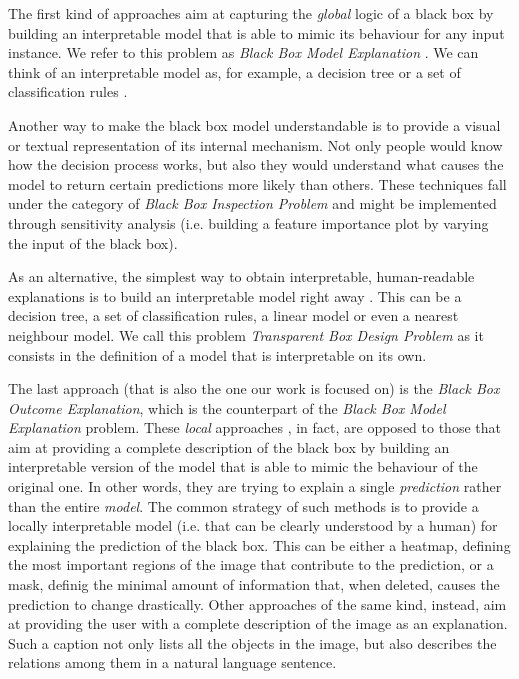 \documentclass[12pt, twoside, a4paper]{report}
\begin{document}
The first kind of approaches aim at capturing the \textit{global} logic of a black box by building an interpretable model that is able to mimic its behaviour for any input instance. We refer to this problem as \textit{Black Box Model Explanation} \cite{survey}. We can think of an interpretable model as, for example, a decision tree \cite{global1, global2, global3} or a set of classification rules \cite{huysmans}. 

Another way to make the black box model understandable is to provide a visual or textual representation of its internal mechanism. Not only people would know how the decision process works, but also they would understand what causes the model to return certain predictions more likely than others. These techniques fall under the category of \textit{Black Box Inspection Problem} and might be implemented through sensitivity analysis \cite{inspection1, inspection2} (i.e. building a feature importance plot by varying the input of the black box). 

As an alternative, the simplest way to obtain interpretable, human-readable explanations is to build an interpretable model right away \cite{transparent1, transparent2, transparent3}. This can be a decision tree, a set of classification rules, a linear model or even a nearest neighbour model. We call this problem \textit{Transparent Box Design Problem} as it consists in the definition of a model that is interpretable on its own.

The last approach (that is also the one our work is focused on) is the \textit{Black Box Outcome Explanation}, which is the counterpart of the \textit{Black Box Model Explanation} problem. 
These \textit{local} approaches \cite{survey}, in fact, are opposed to those that aim at providing a complete description of the black box by building an interpretable version of the model that is able to mimic the behaviour of the original one. In other words, they are trying to explain a single \textit{prediction} rather than the entire \textit{model}.
The common strategy of such methods is to provide a locally interpretable model (i.e. that can be clearly understood by a human) for explaining the prediction of the black box. This can be either a heatmap, defining the most important regions of the image that contribute to the prediction, or a mask, definig the minimal amount of information that, when deleted, causes the prediction to change drastically.
Other approaches of the same kind, instead, aim at providing the user with a complete description of the image as an explanation. Such a caption not only lists all the objects in the image, but also describes the relations among them in a natural language sentence.
\end{document}
